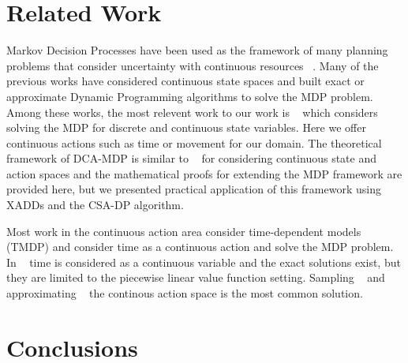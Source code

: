 \documentclass[letterpaper]{article}
\begin{document}
\section{Related Work}
Markov Decision Processes have been used as the framework of many planning problems that consider uncertainty with continuous resources ~\cite{bresina02}. Many of the previous works have considered continuous state spaces and built exact or approximate Dynamic Programming algorithms to solve the MDP problem. Among these works, the most relevent work to our work is ~\cite{sanner11} which considers solving the MDP for discrete and continuous state variables. 
Here we offer continuous actions such as time or movement for our domain. The theoretical framework of DCA-MDP is similar to ~\cite{Rachelson08} for considering continuous state and action spaces and the mathematical proofs for extending the MDP framework are provided here, but we presented practical application of this framework using XADDs and the CSA-DP algorithm. 

Most work in the continuous action area consider time-dependent models (TMDP) and consider time as a continuous action and solve the MDP problem. In ~\cite{boyan00} time is considered as a continuous variable and the exact solutions exist, but they are limited to the piecewise linear value function setting. 
Sampling ~\cite{Weinstein2010} and approximating ~\cite{pegasus} the continous action space is the most common solution. 

\section{Conclusions}




\end{document}
